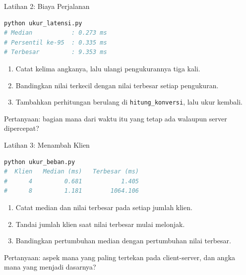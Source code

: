 \documentclass[aspectratio=169, table, 12pt]{beamer}
\begin{document}
\begin{frame}[fragile]{{\Large Latihan 2: Biaya Perjalanan}}
  \vspace{3pt}
\begin{lstlisting}[language=bash]
python ukur_latensi.py
# Median           : 0.273 ms
# Persentil ke-95  : 0.335 ms
# Terbesar         : 9.353 ms
\end{lstlisting}

  \vspace{3pt}
  \begin{enumerate}\small
    \item Catat kelima angkanya, lalu ulangi pengukurannya tiga kali.
    \item Bandingkan nilai terkecil dengan nilai terbesar setiap pengukuran.
    \item Tambahkan perhitungan berulang di \texttt{hitung\_konversi}, lalu ukur
          kembali.
  \end{enumerate}

  \vspace{3pt}
  {\small Pertanyaan: bagian mana dari waktu itu yang tetap ada walaupun
  server dipercepat?}
\end{frame}

\begin{frame}[fragile]{{\Large Latihan 3: Menambah Klien}}
  \vspace{3pt}
\begin{lstlisting}[language=bash]
python ukur_beban.py
#  Klien   Median (ms)   Terbesar (ms)
#      4         0.681           1.405
#      8         1.181        1064.106
\end{lstlisting}

  \vspace{3pt}
  \begin{enumerate}\small
    \item Catat median dan nilai terbesar pada setiap jumlah klien.
    \item Tandai jumlah klien saat nilai terbesar mulai melonjak.
    \item Bandingkan pertumbuhan median dengan pertumbuhan nilai terbesar.
  \end{enumerate}

  \vspace{3pt}
  {\small Pertanyaan: aspek mana yang paling tertekan pada client-server,
  dan angka mana yang menjadi dasarnya?}
\end{frame}
\end{document}
